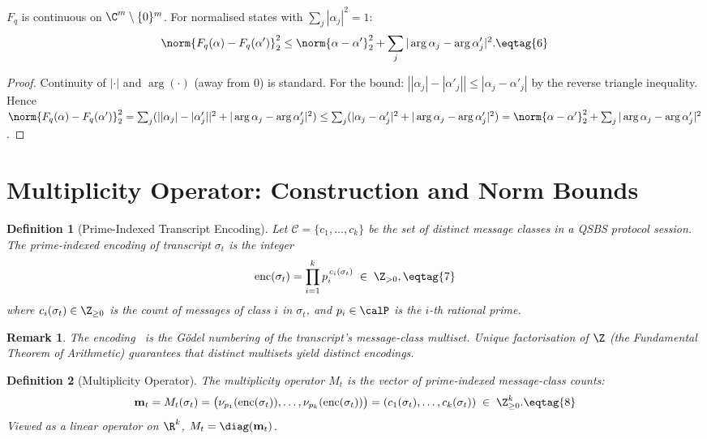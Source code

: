 \documentclass[11pt,letterpaper]{article}
\newtheorem{definition}{Definition}[section]
\newtheorem{remark}{Remark}[section]
\begin{document}
\begin{lemma}[Continuity of $F_q$]\label{lem:Fq-cont}
$F_q$ is continuous on $\C^m\setminus\{0\}^m$.
For normalised states with $\sum_j|\alpha_j|^2=1$:
\[
  \norm{F_q(\alpha)-F_q(\alpha')}_2^2 \leq \norm{\alpha-\alpha'}_2^2
  + \sum_j|\arg\alpha_j - \arg\alpha'_j|^2. \eqtag{6}
\]
\end{lemma}

\begin{proof}
Continuity of $|\cdot|$ and $\arg(\cdot)$ (away from 0) is standard.
For the bound: $|{|\alpha_j|} - {|\alpha'_j|}| \leq |\alpha_j - \alpha'_j|$
by the reverse triangle inequality.
Hence
$\norm{F_q(\alpha)-F_q(\alpha')}_2^2
  = \sum_j (||\alpha_j|-|\alpha'_j||^2 + |\arg\alpha_j-\arg\alpha'_j|^2)
  \leq \sum_j(|\alpha_j-\alpha'_j|^2 + |\arg\alpha_j-\arg\alpha'_j|^2)
  = \norm{\alpha-\alpha'}_2^2 + \sum_j|\arg\alpha_j-\arg\alpha'_j|^2$.
\end{proof}

\section{Multiplicity Operator: Construction and Norm Bounds}
\label{sec:M}

\begin{definition}[Prime-Indexed Transcript Encoding]\label{def:prim-enc}
Let $\mathcal{C} = \{c_1,\ldots,c_k\}$ be the set of distinct message classes in
a QSBS protocol session. The \emph{prime-indexed encoding} of transcript
$\sigma_t$ is the integer
\[
  \mathrm{enc}(\sigma_t) = \prod_{i=1}^{k} p_i^{\,c_i(\sigma_t)} \;\in\;\Z_{>0}, \eqtag{7}
\]
where $c_i(\sigma_t) \in \Z_{\geq 0}$ is the count of messages of class $i$
in $\sigma_t$, and $p_i \in \calP$ is the $i$-th rational prime.
\end{definition}

\begin{remark}
The encoding~ is the Gödel numbering of the transcript's
message-class multiset. Unique factorisation of $\Z$ (the Fundamental Theorem
of Arithmetic) guarantees that distinct multisets yield distinct encodings.
\end{remark}

\begin{definition}[Multiplicity Operator]\label{def:M}
The \emph{multiplicity operator} $M_t$ is the vector of prime-indexed
message-class counts:
\[
  \mathbf{m}_t = M_t(\sigma_t)
    = \bigl(\nu_{p_1}(\mathrm{enc}(\sigma_t)), \ldots,
            \nu_{p_k}(\mathrm{enc}(\sigma_t))\bigr)
    = (c_1(\sigma_t), \ldots, c_k(\sigma_t))
    \;\in\;\Z_{\geq 0}^k. \eqtag{8}
\]
Viewed as a linear operator on $\R^k$, $M_t = \diag(\mathbf{m}_t)$.
\end{definition}
\end{document}
